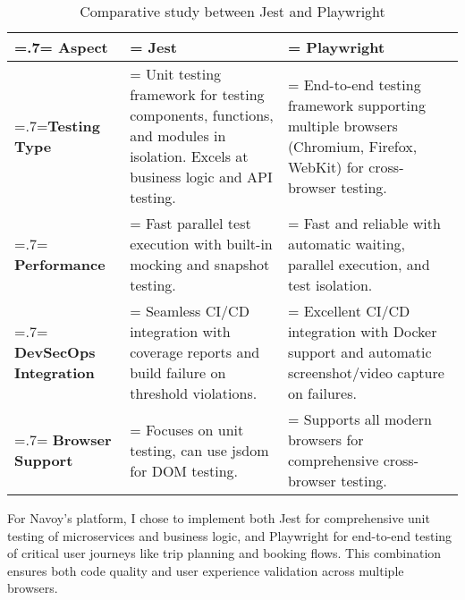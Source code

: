 \begin{table}[H]
    \renewcommand{\arraystretch}{1.5}%
    \caption{Comparative study between Jest and Playwright}
    \centering
    \medskip
    \begin{tabularx}{1\textwidth} {
            | >{\hsize=.7\hsize\linewidth=\hsize\centering\arraybackslash}X
            | >{\hsize=1.15\hsize\linewidth=\hsize\justifying\arraybackslash}X
            | >{\hsize=1.15\hsize\linewidth=\hsize\justifying\arraybackslash}X |}
        \hline
        \rowcolor{primary} \textbf {Aspect} & \textbf {Jest}                                                                                                                          & \textbf {Playwright}                                                                                                       \\
        \hline
        \textbf {Testing Type}              & \noindent Unit testing framework for testing components, functions, and modules in isolation. Excels at business logic and API testing. & \noindent End-to-end testing framework supporting multiple browsers (Chromium, Firefox, WebKit) for cross-browser testing. \\
        \hline
        \textbf {Performance}               & \noindent Fast parallel test execution with built-in mocking and snapshot testing.                                                      & \noindent Fast and reliable with automatic waiting, parallel execution, and test isolation.                                \\
        \hline
        \textbf {DevSecOps Integration}     & \noindent Seamless CI/CD integration with coverage reports and build failure on threshold violations.                                   & \noindent Excellent CI/CD integration with Docker support and automatic screenshot/video capture on failures.              \\
        \hline
        \textbf {Browser Support}           & \noindent Focuses on unit testing, can use jsdom for DOM testing.                                                                       & \noindent Supports all modern browsers for comprehensive cross-browser testing.                                            \\
        \hline
    \end{tabularx}
\end{table}

For Navoy's platform, I chose to implement both Jest for comprehensive unit testing of microservices and business logic, and Playwright for end-to-end testing of critical user journeys like trip planning and booking flows. This combination ensures both code quality and user experience validation across multiple browsers.

